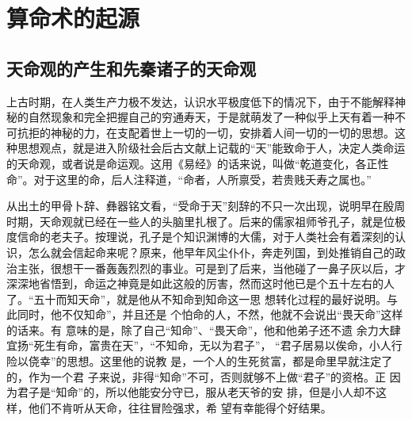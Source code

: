 \chapter{算命术的起源}
\section{天命观的产生和先秦诸子的天命观}
上古时期，在人类生产力极不发达，认识水平极度低下的情况下，由于不能解释神秘的自然现象和完全把握自己的穷通寿天，于是就萌发了一种似乎上天有着一种不可抗拒的神秘的力，在支配着世上一切的一切，安排着人间一切的一切的思想。这种思想观点，就是进入阶级社会后古文献上记载的“天”能致命于人，决定人类命运的天命观，或者说是命运观。这用《易经》的话来说，叫做“乾道变化，各正性命”。对于这里的命，后人注释道，“命者，人所禀受，若贵贱夭寿之属也。”

从出土的甲骨卜辞、彝器铭文看，“受命于天”刻辞的不只一次出现，说明早在殷周时期，天命观就已经在一些人的头脑里扎根了。后来的儒家祖师爷孔子，就是位极度信命的老夫子。按理说，孔子是个知识渊博的大儒，对于人类社会有着深刻的认识，怎么就会信起命来呢？原来，他早年风尘仆仆，奔走列国，到处推销自己的政治主张，很想干一番轰轰烈烈的事业。可是到了后来，当他碰了一鼻子灰以后，才深深地省悟到，命运之神竟是如此这般的厉害，然而这时他已是个五十左右的人了。“五十而知天命”，就是他从不知命到知命这一思
想转化过程的最好说明。与此同时，他不仅知命”，并且还是
个怕命的人，不然，他就不会说出“畏天命”这样的话来。有
意味的是，除了自己“知命”、“畏天命”，他和他弟子还不遗
余力大肆宜扬“死生有命，富贵在天”，“不知命，无以为君子”，
“君子居易以俟命，小人行险以侥幸”的思想。这里他的说教
是，一个人的生死贫富，都是命里早就注定了的，作为一个君
子来说，非得“知命”不可，否则就够不上做“君子”的资格。正
因为君子是“知命”的，所以他能安分守已，服从老天爷的安
排，但是小人却不这样，他们不肯听从天命，往往冒险强求，希
望有幸能得个好结果。